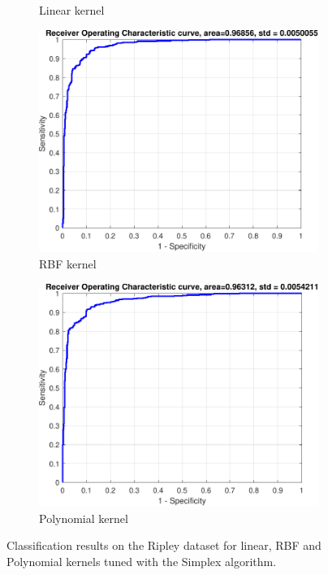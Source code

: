\documentclass{article}
\begin{document}
\begin{figure}[H]
\begin{subfigure}[b]{0.3\textwidth}
                    \caption{Linear kernel}
                     \label{fig:ripley_linear_roc}
                 \end{subfigure}
                 \hfill
                 \begin{subfigure}[b]{0.3\textwidth}
                     \centering
                     \includegraphics[width=\textwidth]{Assignment 1/figures/ripley_simplex_rbf_classifier_roc.pdf}
                    \caption{RBF kernel}
                     \label{fig:ripley_rbf_roc}
                 \end{subfigure}
                 \hfill
                 \begin{subfigure}[b]{0.3\textwidth}
                     \centering
                     \includegraphics[width=\textwidth]{Assignment 1/figures/ripley_simplex_polynomial_classifier_roc.pdf}
                    \caption{Polynomial kernel}
                     \label{fig:ripley_poly_roc}
                 \end{subfigure}
                \caption{Classification results on the Ripley dataset for linear, RBF and Polynomial kernels tuned with the Simplex algorithm.}
                \label{fig:ripley_overall}
            \end{figure}
        
\end{document}
